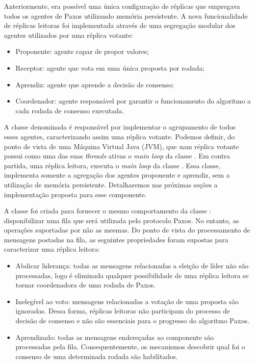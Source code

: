 Anteriormente, era possível uma única configuração de réplicas que empregava todos os
agentes de Paxos utilizando memória persistente. A nova funcionalidade de réplicas
leitoras foi implementada através de uma segregação modular dos agentes utilizados por uma
réplica votante:

\begin{itemize}
  \item Proponente: agente capaz de propor valores;
  \item Receptor: agente que vota em uma única proposta por rodada;
  \item Aprendiz: agente que aprende a decisão de consenso;
  \item Coordenador: agente responsável por garantir o funcionamento do algoritmo a cada
    rodada de consenso executada.
\end{itemize}

A classe denominada  é responsável por implementar o
agrupamento de todos esses agentes, caracterizando assim uma réplica votante. Podemos
definir, do ponto de vista de uma Máquina Virtual Java (JVM), que uam réplica votante
possui como uma das suas \emph{threads} ativas o \emph{main loop} da classe
. Em contra partida, uma réplica leitora, executa o
\emph{main loop} da classe . Essa classe, implementa somente
a agregação dos agentes proponente e aprendiz, sem a utilização de memória persistente.
Detalharemos nas próximas seções a implementação proposta para esse componente.


A classe  foi criada para fornecer o mesmo comportamento da
classe : disponibilizar uma fila que será utilizada pelo
protocolo Paxos. No entanto, as operações suportadas por 
não as mesmas. Do ponto de vista do processamento de mensagens postadas na fila, as
seguintes propriedades foram supostas para caracterizar uma réplica leitora:

\begin{itemize}
  \item Abdicar liderança: todas as mensagens relacionadas a eleição de líder não são
    processadas, logo é eliminada qualquer possibilidade de uma réplica leitora se tornar
    coordenadora de uma rodada de Paxos.
  \item Inelegível ao voto: mensagens relacionadas a votação de uma proposta são
    ignoradas. Dessa forma, réplicas leitoras não participam do processo de decisão de
    consenso e não são essenciais para o progresso do algoritmo Paxos.
  \item Aprendizado: todas as mensagens endereçadas ao componente  são
    processadas pela fila. Consequentemente, os mecanismos descobrir qual foi o consenso
    de uma determinada rodada são habilitados.
\end{itemize}

